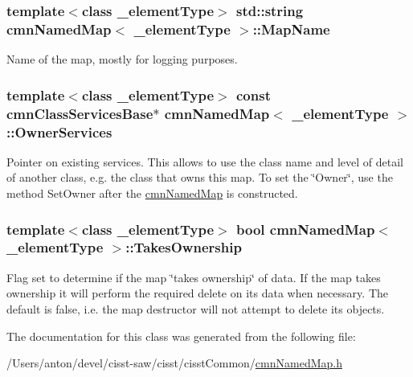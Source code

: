 \subsubsection[{Map\+Name}]{\setlength{\rightskip}{0pt plus 5cm}template$<$class \+\_\+element\+Type$>$ std\+::string {\bf cmn\+Named\+Map}$<$ \+\_\+element\+Type $>$\+::Map\+Name\hspace{0.3cm}{\ttfamily [protected]}}\label{classcmn_named_map_a5dd1ca924e7481edf3e9c6f65c0f4b3d}
Name of the map, mostly for logging purposes. \hypertarget{classcmn_named_map_a8e6bffe8f1bdc710bacc3f1d38d75621}{}
\subsubsection[{Owner\+Services}]{\setlength{\rightskip}{0pt plus 5cm}template$<$class \+\_\+element\+Type$>$ const {\bf cmn\+Class\+Services\+Base}$\ast$ {\bf cmn\+Named\+Map}$<$ \+\_\+element\+Type $>$\+::Owner\+Services\hspace{0.3cm}{\ttfamily [protected]}}\label{classcmn_named_map_a8e6bffe8f1bdc710bacc3f1d38d75621}
Pointer on existing services. This allows to use the class name and level of detail of another class, e.\+g. the class that owns this map. To set the \char`\"{}\+Owner\char`\"{}, use the method Set\+Owner after the \hyperlink{classcmn_named_map}{cmn\+Named\+Map} is constructed. \hypertarget{classcmn_named_map_ad3775ffc68ea99a853f8eed94f1f1a4f}{}
\subsubsection[{Takes\+Ownership}]{\setlength{\rightskip}{0pt plus 5cm}template$<$class \+\_\+element\+Type$>$ bool {\bf cmn\+Named\+Map}$<$ \+\_\+element\+Type $>$\+::Takes\+Ownership\hspace{0.3cm}{\ttfamily [protected]}}\label{classcmn_named_map_ad3775ffc68ea99a853f8eed94f1f1a4f}
Flag set to determine if the map \char`\"{}takes ownership\char`\"{} of data. If the map takes ownership it will perform the required {\ttfamily delete} on its data when necessary. The default is false, i.\+e. the map destructor will not attempt to delete its objects. 

The documentation for this class was generated from the following file\+:\begin{DoxyCompactItemize}
\item 
/\+Users/anton/devel/cisst-\/saw/cisst/cisst\+Common/\hyperlink{cmn_named_map_8h}{cmn\+Named\+Map.\+h}\end{DoxyCompactItemize}
